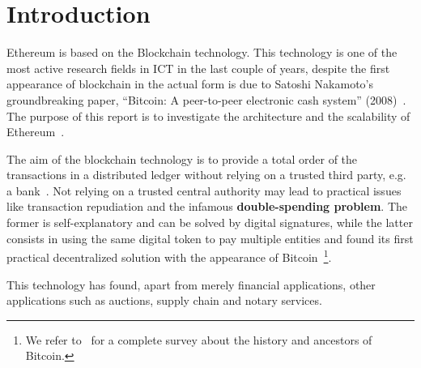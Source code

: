 \section{Introduction}

Ethereum is based on the Blockchain technology. This technology is one of the
most active research fields in ICT in the last couple of years, despite the
first appearance of blockchain in the actual form is due to Satoshi Nakamoto's
groundbreaking paper, ``Bitcoin: A peer-to-peer electronic cash system''
(2008)~\cite{bib:bitcoin}. The purpose of this report is to investigate the
architecture and the scalability of Ethereum~\cite{wood2018ethereum}.

The aim of the blockchain technology is to provide a total order of the
transactions in a distributed ledger without relying on a trusted third party,
e.g. a bank~\cite{bib:the-quest}. Not relying on a trusted central authority may
lead to practical issues like transaction repudiation and the infamous
\textbf{double-spending problem}. The former is self-explanatory and can be
solved by digital signatures, while the latter consists in using the same
digital token to pay multiple entities and found its first practical
decentralized solution with the appearance of
Bitcoin~\cite{ethereumwp}\footnote{We refer to~\cite{ethereumwp} for a complete
survey about the history and ancestors of Bitcoin.}.

This technology has found, apart from merely financial applications, other
applications such as auctions, supply chain and notary services.

